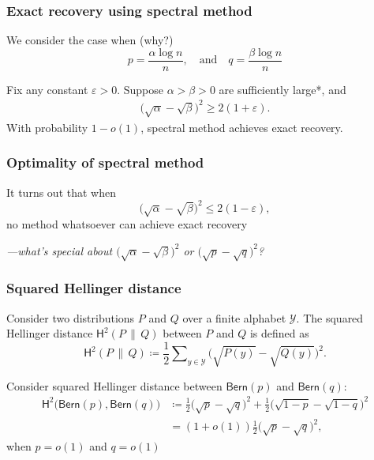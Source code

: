 \documentclass[compress,
mathserif,wide,%
]{beamer}
\begin{document}
\begin{frame}
	\frametitle{Exact recovery using spectral method}
	We consider the case when (why?)
	\[
	p=\frac{\alpha \log n}{n}, \quad \text{and} \quad q=\frac{\beta \log n}{n}
	\]
	
	\begin{theorem}
	\label{thm:community-recovery-linf}
	Fix any constant $\varepsilon>0$. Suppose $\alpha > \beta >0$ are sufficiently large*, and	%
	\begin{align*}
		\big( \sqrt{\alpha} -\sqrt{\beta}\big)^2 \geq   2\left( 1+ \varepsilon  \right) .
	\end{align*}
	With probability  $1-o(1)$, spectral method achieves exact recovery. 
\end{theorem}


\end{frame}

\begin{frame}
	\frametitle{Optimality of spectral method}
	It turns out that when 
	\[
	\big( \sqrt{\alpha} -\sqrt{\beta}\big)^2 \leq   2\left( 1 - \varepsilon  \right),
	\]
	no method whatsoever can achieve exact recovery
	
	\vfill
	{\hfill \em ---what's special about $\big( \sqrt{\alpha} -\sqrt{\beta}\big)^2$ or $\big( \sqrt{p} -\sqrt{q}\big)^2$?}
	

\end{frame}

\begin{frame}
	\frametitle{Squared Hellinger distance}
	\begin{definition}
%
\label{defn:Hellinger-distance}
Consider two distributions $P$ and $Q$ over a finite alphabet $\mathcal{Y}$. The squared Hellinger distance $\mathsf{H}^2(P\,\|\,Q)$ between $P$ and $Q$  is defined as 	%
\begin{equation}
\mathsf{H}^2(P\,\|\,Q)\coloneqq\frac{1}{2}\sum\nolimits_{y\in \mathcal{Y}}\Big(\sqrt{P(y)}-\sqrt{Q(y)}\Big)^{2}.
\label{eq:defn-Hellinger-PQ}
\end{equation}
%
\end{definition}

Consider squared Hellinger distance between $\mathsf{Bern}(p)$ and $\mathsf{Bern}(q)$:
\begin{align*}
	\mathsf{H}^2\big( \mathsf{Bern}(p),   \mathsf{Bern}(q) \big) 
	&\coloneqq \frac{1}{2} \big( \sqrt{p} -\sqrt{q}\big)^2 + \frac{1}{2} \big( \sqrt{1-p} -\sqrt{1-q}\big)^2 \nonumber\\
	&= (1+o(1)) \frac{1}{2} \big( \sqrt{p} -\sqrt{q}\big)^2,
\end{align*}
%
when $p=o(1)$ and $q=o(1)$ 

\end{frame}
\end{document}
